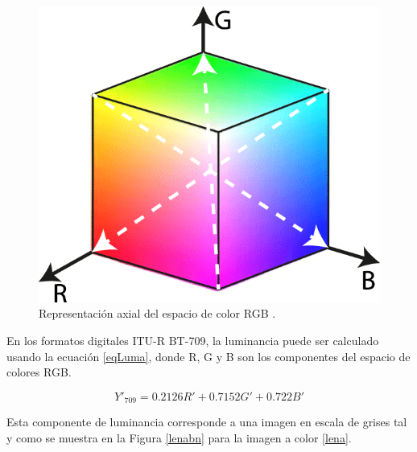 \documentclass[twoside,spanish,ESP,MSc]{plantillaLabUPV}
\theoremstyle{definition}
\begin{document}
\begin{figure}[!tbh] 
	\centering 
		\includegraphics[scale=.35]{ima/rgbcol} 
	\caption{Representación axial del espacio de color RGB \cite{rgbspace}.} 
	\label{rgbcol} 
\end{figure}

En los formatos digitales ITU-R BT-709, la luminancia puede ser calculado usando la ecuación \ref{eqLuma}, donde R, G y B son los componentes del espacio de colores RGB.

\begin{equation}\label{eqLuma}
{\displaystyle Y'_{\text{709}}=0.2126R'+0.7152G'+0.722B'}
\end{equation}

Esta componente de luminancia corresponde a una imagen en escala de grises tal y como se muestra en la Figura \ref{lenabn} para la imagen a color \ref{lena}.
\end{document}
